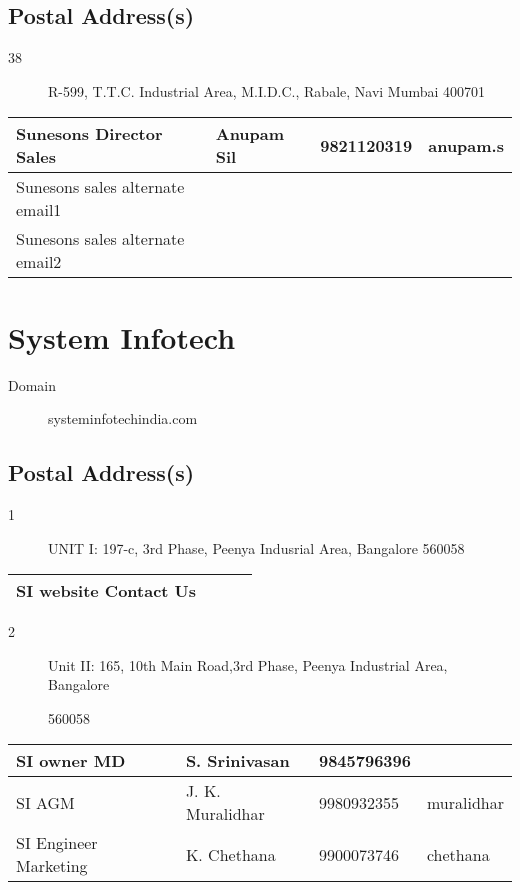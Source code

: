 \documentclass[a4paper, 11pt, twoside]{book}
\begin{document}
\subsection*{Postal Address(s)}
\begin{description}
\item [38]R-599, T.T.C. Industrial Area, M.I.D.C., Rabale, Navi Mumbai 400701
\end{description}
\begin{tabular}{|p{4cm}|p{2cm}|p{2cm}|p{3cm}|}
\hline
Sunesons Director Sales & Anupam Sil & 9821120319 & anupam.s \\ \hline
Sunesons sales alternate email1 & & &  \\ \hline
Sunesons sales alternate email2 & & &  \\ \hline
\end{tabular}
\section{System Infotech}\label{com:1}
\begin{description}
\item[Domain]systeminfotechindia.com
\end{description}
\subsection*{Postal Address(s)}
\begin{description}
\item [1]UNIT I:  197-c, 3rd Phase, Peenya Indusrial Area, Bangalore 560058
\end{description}
\begin{tabular}{|p{4cm}|p{2cm}|p{2cm}|p{3cm}|}
\hline
SI website Contact Us & & &  \\ \hline
\end{tabular}
\begin{description}
\item [2]Unit II: 165, 10th Main Road,3rd Phase, Peenya Industrial Area, Bangalore

 560058
\end{description}
\begin{tabular}{|p{4cm}|p{2cm}|p{2cm}|p{3cm}|}
\hline
SI owner MD & S. Srinivasan & 9845796396 &  \\ \hline
SI AGM & J. K. Muralidhar & 9980932355 & muralidhar \\ \hline
SI Engineer Marketing & K. Chethana & 9900073746 & chethana \\ \hline
\end{tabular}
\end{document}
